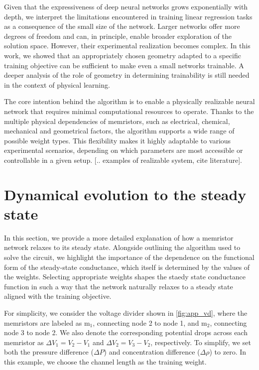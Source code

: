 \documentclass[reprint,superscriptaddress,prb,showkeys]{revtex4-2}
\newcommand{\m}{\text{m}} %
\begin{document}
Given that the expressiveness of deep neural networks grows exponentially with depth\cite{big_neuralnet1, big_neuralnet2}, we interpret the limitations encountered in training linear regression tasks as a consequence of the small size of the network. Larger networks offer more degrees of freedom and can, in principle, enable broader exploration of the solution space. However, their experimental realization becomes complex. In this work, we showed that an appropriately chosen geometry adapted to a specific training objective can be sufficient to make even a small networks trainable. A deeper analysis of the role of geometry in determining trainability is still needed in the context of physical learning. 

The core intention behind the algorithm is to enable a physically realizable neural network that requires minimal computational resources to operate. Thanks to the multiple physical dependencies of memristors, such as electrical, chemical, mechanical and geometrical factors, the algorithm supports a wide range of possible weight types. This flexibility makes it highly adaptable to various experimental scenarios, depending on which parameters are most accessible or controllable in a given setup. [.. examples of realizable system, cite literature].

\cleardoublepage
\appendix

\section{Dynamical evolution to the steady state \label{app:dyn_evol_steady_state}}

In this section, we provide a more detailed explanation of how a memristor network relaxes to its steady state. Alongside outlining the algorithm used to solve the circuit, we highlight the importance of the dependence on the functional form of the steady-state conductance, which itself is determined by the values of the weights. Selecting appropriate weights shapes the staedy state conductance function in such a way that the network naturally relaxes to a steady state aligned with the training objective.

For simplicity, we consider the voltage divider shown in \cref{fig:app_vd}, where the memristors are labeled as $ \m_1 $, connecting node 2 to node 1, and $ \m_2 $, connecting node 3 to node 2. We also denote the corresponding potential drops across each memristor as $ \Delta V_1 = V_2 - V_1$ and $ \Delta V_2  = V_3 - V_2$, respectively. To simplify, we set both the pressure difference ($ \Delta P $) and concentration difference ($ \Delta \rho $) to zero. In this example, we choose the channel length as the training weight.
\end{document}
